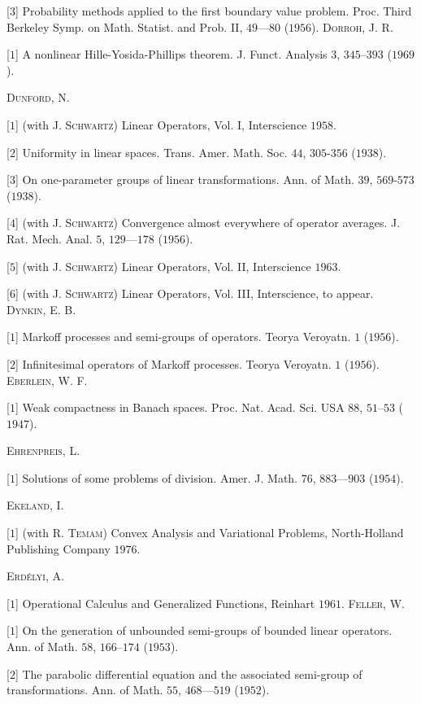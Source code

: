 [$3$] Probability methods applied to the first boundary value problem. Proc. Third Berkeley Symp. on Math. Statist. and Prob. II, $49$---$80$ ($1956$). \textsc{Dorroh}, J. R. 

[$1$] A nonlinear Hille-Yosida-Phillips theorem. J. Funct. Analysis $3$, $345$--$393$ ($1969$). 

\textsc{Dunford}, N. 

[$1$] (with J. \textsc{Schwartz}) Linear Operators, Vol. I, Interscience $1958$. 

[$2$] Uniformity in linear spaces. Trans. Amer. Math. Soc. $44$, $305$-$356$ ($1938$). 

[$3$] On one-parameter groups of linear transformations. Ann. of Math. $39$, $569$-$573$ ($1938$). 

[$4$] (with J. \textsc{Schwartz}) Convergence almost everywhere of operator averages. J. Rat. Mech. Anal. $5$, $129$---$178$ ($1956$). 

[$5$] (with J. \textsc{Schwartz}) Linear Operators, Vol. II, Interscience $1963$. 

[$6$] (with J. \textsc{Schwartz}) Linear Operators, Vol. III, Interscience, to appear. \textsc{Dynkin}, E. B. 

[$1$] Markoff processes and semi-groups of operators. Teorya Veroyatn. $1$ ($1956$). 

[$2$] Infinitesimal operators of Markoff processes. Teorya Veroyatn. $1$ ($1956$). \textsc{Eberlein}, W. F. 

[$1$] Weak compactness in Banach spaces. Proc. Nat. Acad. Sci. USA $88$, $51$--$53$ ($1947$). 

\textsc{Ehrenpreis}, L. 

[$1$] Solutions of some problems of division. Amer. J. Math. $76$, $883$---$903$ ($1954$). 

\textsc{Ekeland}, I. 

[$1$] (with R. \textsc{Temam}) Convex Analysis and Variational Problems, North-Holland Publishing Company $1976$. 

\textsc{Erdélyi}, A. 

[$1$] Operational Calculus and Generalized Functions, Reinhart $1961$. \textsc{Feller}, W. 

[$1$] On the generation of unbounded semi-groups of bounded linear operators. Ann. of Math. $58$, $166$--$174$ ($1953$). 

[$2$] The parabolic differential equation and the associated semi-group of transformations. Ann. of Math. $55$, $468$---$519$ ($1952$). 

